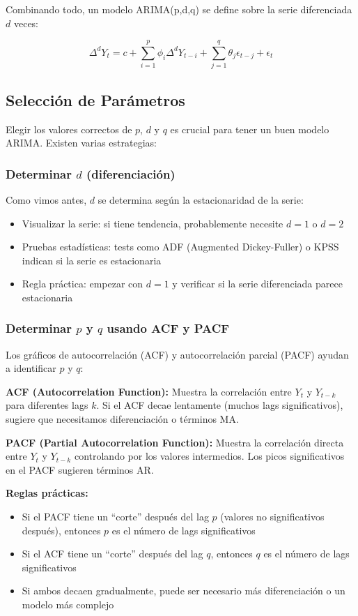 \documentclass[12pt]{article}
\begin{document}
Combinando todo, un modelo ARIMA(p,d,q) se define sobre la serie diferenciada $d$ veces:

\[
\Delta^d Y_t = c + \sum_{i=1}^{p} \phi_i \Delta^d Y_{t-i} + \sum_{j=1}^{q} \theta_j \epsilon_{t-j} + \epsilon_t
\]

\subsection{Selección de Parámetros}

Elegir los valores correctos de $p$, $d$ y $q$ es crucial para tener un buen modelo ARIMA. Existen varias estrategias:

\subsubsection{Determinar $d$ (diferenciación)}

Como vimos antes, $d$ se determina según la estacionaridad de la serie:
\begin{itemize}
    \item Visualizar la serie: si tiene tendencia, probablemente necesite $d=1$ o $d=2$
    \item Pruebas estadísticas: tests como ADF (Augmented Dickey-Fuller) o KPSS indican si la serie es estacionaria
    \item Regla práctica: empezar con $d=1$ y verificar si la serie diferenciada parece estacionaria
\end{itemize}

\subsubsection{Determinar $p$ y $q$ usando ACF y PACF}

Los gráficos de autocorrelación (ACF) y autocorrelación parcial (PACF) ayudan a identificar $p$ y $q$:

\textbf{ACF (Autocorrelation Function):} Muestra la correlación entre $Y_t$ y $Y_{t-k}$ para diferentes lags $k$. Si el ACF decae lentamente (muchos lags significativos), sugiere que necesitamos diferenciación o términos MA.

\textbf{PACF (Partial Autocorrelation Function):} Muestra la correlación directa entre $Y_t$ y $Y_{t-k}$ controlando por los valores intermedios. Los picos significativos en el PACF sugieren términos AR.

\textbf{Reglas prácticas:}
\begin{itemize}
    \item Si el PACF tiene un ``corte'' después del lag $p$ (valores no significativos después), entonces $p$ es el número de lags significativos
    \item Si el ACF tiene un ``corte'' después del lag $q$, entonces $q$ es el número de lags significativos
    \item Si ambos decaen gradualmente, puede ser necesario más diferenciación o un modelo más complejo
\end{itemize}
\end{document}

